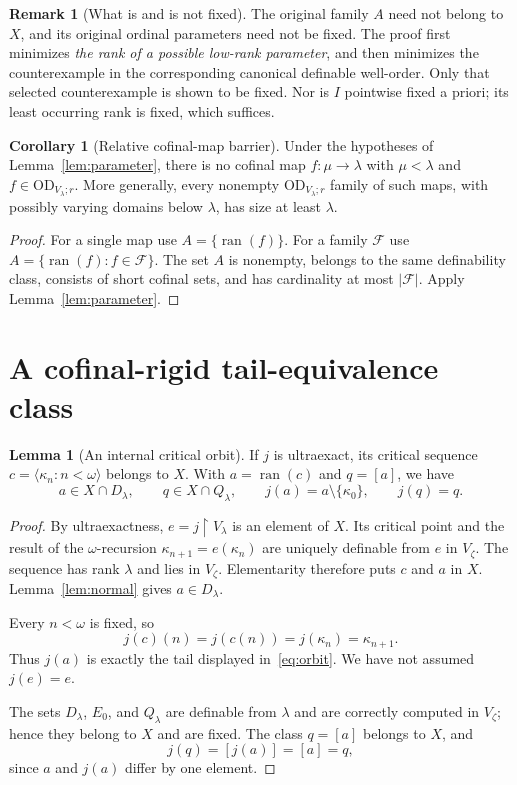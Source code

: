 \documentclass[11pt,letterpaper]{article}
\theoremstyle{definition}
\newtheorem{lemma}[definition]{Lemma}
\newtheorem{corollary}[definition]{Corollary}
\newtheorem{remark}[definition]{Remark}
\numberwithin{equation}{section}
\newcommand{\OD}{\mathrm{OD}}
\newcommand{\ran}{\operatorname{ran}}
\newcommand{\restr}{\mathbin{\upharpoonright}}
\newcommand{\D}{D_\lambda}
\newcommand{\Q}{Q_\lambda}
\begin{document}
\begin{remark}[What is and is not fixed]\label{rem:fixed}
The original family $A$ need not belong to $X$, and its original ordinal parameters need not be fixed. The proof first minimizes \emph{the rank of a possible low-rank parameter}, and then minimizes the counterexample in the corresponding canonical definable well-order. Only that selected counterexample is shown to be fixed. Nor is $I$ pointwise fixed a priori; its least occurring rank is fixed, which suffices.
\end{remark}

\begin{corollary}[Relative cofinal-map barrier]\label{cor:maps}
Under the hypotheses of Lemma~\ref{lem:parameter}, there is no cofinal map $f:\mu\to\lambda$ with $\mu<\lambda$ and $f\in\OD_{V_\lambda;r}$. More generally, every nonempty $\OD_{V_\lambda;r}$ family of such maps, with possibly varying domains below $\lambda$, has size at least $\lambda$.
\end{corollary}
\begin{proof}
For a single map use $A=\{\ran(f)\}$. For a family $\mathcal F$ use $A=\{\ran(f):f\in\mathcal F\}$. The set $A$ is nonempty, belongs to the same definability class, consists of short cofinal sets, and has cardinality at most $|\mathcal F|$. Apply Lemma~\ref{lem:parameter}.
\end{proof}

\section{A cofinal-rigid tail-equivalence class}\label{sec:main}

\begin{lemma}[An internal critical orbit]\label{lem:orbit}
If $j$ is ultraexact, its critical sequence $c=\langle\kappa_n:n<\omega\rangle$ belongs to $X$. With $a=\ran(c)$ and $q=[a]$, we have
\begin{equation}
a\in X\cap\D,\qquad q\in X\cap\Q,
\qquad j(a)=a\setminus\{\kappa_0\},\qquad j(q)=q.
\label{eq:orbit}
\end{equation}
\end{lemma}
\begin{proof}
By ultraexactness, $e=j\restr V_\lambda$ is an element of $X$. Its critical point and the result of the $\omega$-recursion $\kappa_{n+1}=e(\kappa_n)$ are uniquely definable from $e$ in $V_\zeta$. The sequence has rank $\lambda$ and lies in $V_\zeta$. Elementarity therefore puts $c$ and $a$ in $X$. Lemma~\ref{lem:normal} gives $a\in\D$.

Every $n<\omega$ is fixed, so
\[
j(c)(n)=j(c(n))=j(\kappa_n)=\kappa_{n+1}.
\]
Thus $j(a)$ is exactly the tail displayed in~\eqref{eq:orbit}. We have not assumed $j(e)=e$.

The sets $\D$, $E_0$, and $\Q$ are definable from $\lambda$ and are correctly computed in $V_\zeta$; hence they belong to $X$ and are fixed. The class $q=[a]$ belongs to $X$, and
\[
j(q)=[j(a)]=[a]=q,
\]
since $a$ and $j(a)$ differ by one element.
\end{proof}
\end{document}
